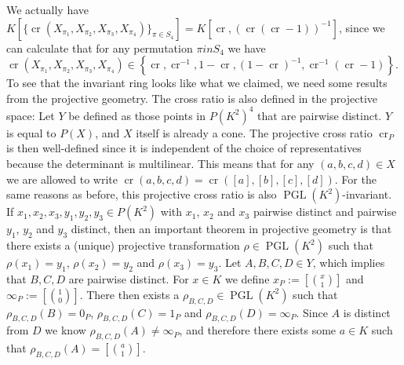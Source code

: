 \begin{example}
  We actually have $K[\{\operatorname{cr}(X_{\pi_1},X_{\pi_2},X_{\pi_3},X_{\pi_4})\}_{\pi \in S_4}] = K[\operatorname{cr},(\operatorname{cr}(\operatorname{cr} -1))^{-1}] $, since we can calculate that for any permutation $\pi in S_4$ we have $ \operatorname{cr}(X_{\pi_1},X_{\pi_2},X_{\pi_3},X_{\pi_4}) \in \left\{ \operatorname{cr}, \operatorname{cr}^{-1}, 1 - \operatorname{cr}, (1-\operatorname{cr})^{-1}, \operatorname{cr}^{-1}(\operatorname{cr}-1)\right\}$.
  To see that the invariant ring looks like what we claimed, we need some results from the projective geometry.
  The cross ratio is also defined in the projective space:
  Let $Y$ be defined as those points in $P(K^2)^4$ that are pairwise distinct.
  $Y$ is equal to $P(X)$, and $X$ itself is already a cone.
  The projective cross ratio $\operatorname{cr}_P$ is then well-defined since it is independent of the choice of representatives because the determinant is multilinear.
  This means that for any $ (a,b,c,d) \in X $ we are allowed to write $\operatorname{cr}(a,b,c,d) = \operatorname{cr}([a],[b],[c],[d]) $.
  For the same reasons as before, this projective cross ratio is also $\operatorname{PGL}(K^2)$-invariant.
  If $x_1,x_2,x_3,y_1,y_2,y_3 \in P(K^2)$ with $x_1$, $x_2$ and $x_3$ pairwise distinct and pairwise $y_1$, $y_2$ and $y_3$ distinct, then an important theorem in projective geometry is that there exists a (unique) projective transformation $ \rho \in \operatorname{PGL}(K^2)$ such that $\rho (x_1) = y_1$, $\rho(x_2) = y_2$ and $\rho(x_3) = y_3$.
  Let $A,B,C,D \in Y$, which implies that $B,C,D$ are pairwise distinct.
  For $x \in K $ we define $x_P := \left[\binom{x}{1}\right]$ and $\infty_P := \left[\binom{1}{0}\right]$.
  There then exists a $\rho_{B,C,D} \in \operatorname{PGL}(K^2)$ such that $\rho_{B,C,D} (B) = 0_P$, $\rho_{B,C,D} (C) = 1_P$ and $\rho_{B,C,D} (D) = \infty_P$.
  Since $A$ is distinct from $D$ we know $\rho_{B,C,D} (A) \neq \infty_P$, and therefore there exists some $a \in K$ such that $\rho_{B,C,D}(A) = [\binom{a}{1}]$.

\end{example}
